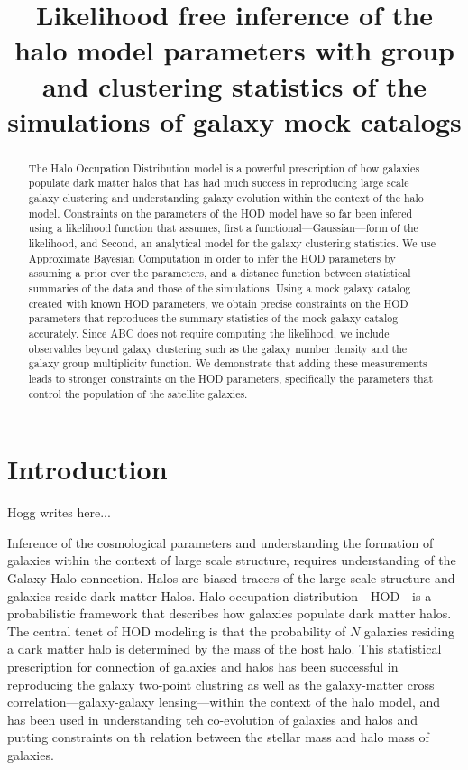 \documentclass[12pt, preprint]{aastex}
\begin{document}
\title{Likelihood free inference of the halo model parameters with group and clustering 
       statistics of the simulations of galaxy mock catalogs}

\begin{abstract}

The Halo Occupation Distribution model is a powerful prescription of how galaxies populate 
dark matter halos that has had much success in reproducing large scale galaxy clustering and understanding
galaxy evolution within the context of the halo model. Constraints on the parameters of the HOD model have 
so far been infered using a likelihood function that assumes, first a functional---Gaussian---form of the likelihood, 
and Second, an analytical model for the galaxy clustering statistics. We use Approximate Bayesian Computation 
in order to infer the HOD parameters by assuming a prior over the parameters, and a distance function between 
statistical summaries of the data and those of the simulations.
Using a mock galaxy catalog created with known HOD parameters, we obtain precise constraints on the HOD parameters that 
reproduces the summary statistics of the mock galaxy catalog accurately. 
Since ABC does not require computing the likelihood, we include observables beyond galaxy clustering such as 
the galaxy number density and the galaxy group multiplicity function. 
We demonstrate that adding these measurements leads to stronger constraints on the HOD parameters, specifically the parameters 
that control the population of the satellite galaxies.

\end{abstract}

\section{Introduction}

Hogg writes here...

Inference of the cosmological parameters and understanding the formation of galaxies within the context of large scale 
structure, requires understanding of the Galaxy-Halo connection. Halos are biased tracers of the large scale structure 
and galaxies reside dark matter Halos. Halo occupation distribution---HOD---is a probabilistic framework that describes how 
galaxies populate dark matter halos. The central tenet of HOD modeling is that the probability of $N$ galaxies residing a 
dark matter halo is determined by the mass of the host halo. This statistical prescription for connection of galaxies and halos 
has been successful in reproducing the galaxy two-point clustring as well as the galaxy-matter cross correlation---galaxy-galaxy 
lensing---within the context of the halo model, and has been used in understanding teh co-evolution of galaxies and halos and putting 
constraints on th relation between the stellar mass and halo mass of galaxies.
\end{document}
